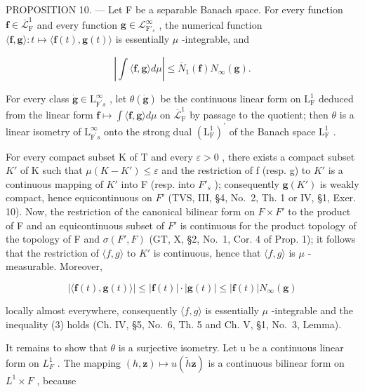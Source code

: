 PROPOSITION 10. --- Let F be a separable Banach space. For every function \(\mathbf{f} \in \overline{\mathcal{L}}_{\mathrm{F}}^{1}\) and every function \(\mathbf{g} \in \mathcal{L}_{\mathrm{F}'_s}^{\infty}\) , the numerical function \(\langle \mathbf{f}, \mathbf{g} \rangle : t \mapsto \langle \mathbf{f}(t), \mathbf{g}(t) \rangle\) is essentially \(\mu\) -integrable, and

\[
\left| \int \langle \mathbf {f}, \mathbf {g} \rangle d \mu \right| \leqslant \overline {{{{N}}}} _ {1} (\mathbf {f}) N _ {\infty} (\mathbf {g}).\tag{3}
\]

For every class \(\dot{\mathbf{g}}\in\mathrm{L}_{\mathrm{F}^{\prime}s}^{\infty}\) , let \(\theta(\dot{\mathbf{g}})\) be the continuous linear form on \(\mathrm{L}_{\mathrm{F}}^{1}\) deduced from the linear form \(\mathbf{f}\mapsto\int\langle\mathbf{f},\mathbf{g}\rangle d\mu\) on \(\overline{\mathcal{L}}_{\mathrm{F}}^{1}\) by passage to the quotient; then \(\theta\) is a linear isometry of \(\mathrm{L}_{\mathrm{F}^{\prime}s}^{\infty}\) onto the strong dual \((\mathrm{L}_{\mathrm{F}}^{1})^{\prime}\) of the Banach space \(\mathrm{L}_{\mathrm{F}}^{1}\) .

For every compact subset K of T and every \(\varepsilon > 0\) , there exists a compact subset \(K'\) of K such that \(\mu(K - K') \leqslant \varepsilon\) and the restriction of f (resp. g) to \(K'\) is a continuous mapping of \(K'\) into F (resp. into \(F'_s\) ); consequently \(\mathbf{g}(K')\) is weakly compact, hence equicontinuous on \(F'\) (TVS, III, §4, No.~2, Th. 1 or IV, §1, Exer. 10). Now, the restriction of the canonical bilinear form on \(F \times F'\) to the product of F and an equicontinuous subset of \(F'\) is continuous for the product topology of the topology of F and \(\sigma(F', F)\) (GT, X, §2, No.~1, Cor. 4 of Prop. 1); it follows that the restriction of \(\langle f, g \rangle\) to \(K'\) is continuous, hence that \(\langle f, g \rangle\) is \(\mu\) -measurable. Moreover,

\[
| \langle \mathbf {f} (t), \mathbf {g} (t) \rangle | \leqslant | \mathbf {f} (t) | \cdot | \mathbf {g} (t) | \leqslant | \mathbf {f} (t) | N _ {\infty} (\mathbf {g})
\]

locally almost everywhere, consequently \(\langle f,g\rangle\) is essentially \(\mu\) -integrable and the inequality (3) holds (Ch. IV, §5, No.~6, Th. 5 and Ch. V, §1, No.~3, Lemma).

It remains to show that \(\theta\) is a surjective isometry. Let u be a continuous linear form on \(L_{F}^{1}\) . The mapping \((h,\mathbf{z})\mapsto u(\widetilde{h}\mathbf{z})\) is a continuous bilinear form on \(L^{1}\times F\) , because

